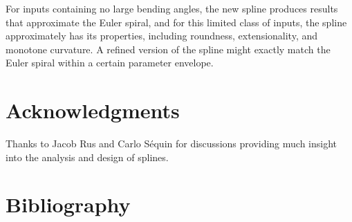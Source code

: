 \documentclass{article}
\begin{document}
For inputs containing no large bending angles, the new spline produces results that approximate the Euler spiral, and for this limited class of inputs, the spline approximately has its properties, including roundness, extensionality, and monotone curvature. A refined version of the spline might exactly match the Euler spiral within a certain parameter envelope.

\section{Acknowledgments}

Thanks to Jacob Rus and Carlo S{\'e}quin for discussions providing much insight into the analysis and design of splines.

\section{Bibliography}

{}

\end{document}
